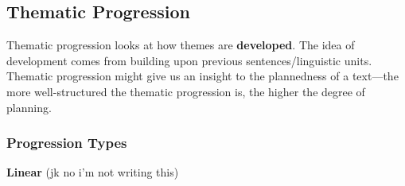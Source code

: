\documentclass[../main.tex]{subfiles}
\begin{document}
    \subsection{Thematic Progression}
    Thematic progression looks at how themes are \textbf{developed}. The idea of development comes from building upon previous sentences/linguistic units. Thematic progression might give us an insight to the plannedness of a text---the more well-structured the thematic progression is, the higher the degree of planning.

        \subsubsection{Progression Types}
        \textbf{Linear}
		(jk no i'm not writing this)
\end{document}
